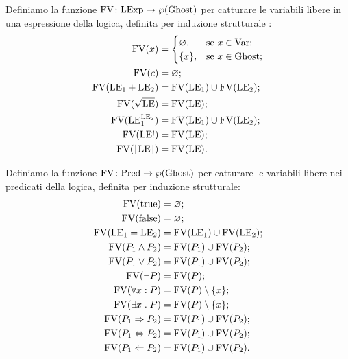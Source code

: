 \begin{definizione} 
Definiamo la funzione $\mathord{\mathrm{FV}}\colon\mathrm{LExp}\to\wp(\mathrm{Ghost})$ per catturare le variabili libere in una espressione della logica, definita per induzione strutturale :
\begin{align*}
   \mathrm{FV}(x)
      &=
        \begin{cases}
            \varnothing,&\text{se $x  \in \mathrm{Var}$};\\
            \{x\},    &\text{se $x  \in \mathrm{Ghost}$};
        \end{cases} \\
   \mathrm{FV}(c)
      &= \varnothing;\\
   \mathrm{FV}(\mathrm{LE}_1 + \mathrm{LE}_2)
      &= \mathrm{FV}(\mathrm{LE}_1) \cup \mathrm{FV}(\mathrm{LE}_2);\\
   \mathrm{FV}(\sqrt{\mathrm{LE}})
      &= \mathrm{FV}(\mathrm{LE});\\
   \mathrm{FV}(\mathrm{LE}_1^{\mathrm{LE}_2})
      &= \mathrm{FV}(\mathrm{LE}_1) \cup \mathrm{FV}(\mathrm{LE}_2);\\
   \mathrm{FV}(\mathrm{LE}!)
      &= \mathrm{FV}(\mathrm{LE});\\
   \mathrm{FV}(\lfloor \mathrm{LE} \rfloor)
      &= \mathrm{FV}(\mathrm{LE}).
\end{align*}
\end{definizione}

\begin{definizione} 
Definiamo la funzione $\mathord{\mathrm{FV}}\colon\mathrm{Pred}\to\wp(\mathrm{Ghost})$ per catturare
le variabili libere nei predicati della logica,
definita per induzione strutturale:
\begin{align*}
   \mathrm{FV}(\mathrm{true})
      &= \varnothing;\\
   \mathrm{FV}(\mathrm{false})
      &= \varnothing;\\
   \mathrm{FV}(\mathrm{LE}_1 = \mathrm{LE}_2)
      &= \mathrm{FV}(\mathrm{LE}_1) \cup \mathrm{FV}(\mathrm{LE}_2);\\
   \mathrm{FV}(P_1 \land P_2)
      &= \mathrm{FV}(P_1) \cup \mathrm{FV}(P_2);\\
   \mathrm{FV}(P_1 \lor P_2)
      &= \mathrm{FV}(P_1) \cup \mathrm{FV}(P_2);\\
   \mathrm{FV}(\neg P)
      &= \mathrm{FV}(P);\\
   \mathrm{FV}(\forall x \mathrel{:} P)
      &= \mathrm{FV}(P)\setminus \{x\};\\
   \mathrm{FV}(\exists x \mathrel{.} P)
      &= \mathrm{FV}(P)\setminus \{x\};\\
   \mathrm{FV}(P_1 \Rightarrow P_2)
      &= \mathrm{FV}(P_1) \cup \mathrm{FV}(P_2);\\
   \mathrm{FV}(P_1 \Leftrightarrow P_2)
      &= \mathrm{FV}(P_1) \cup \mathrm{FV}(P_2);\\
   \mathrm{FV}(P_1 \Leftarrow P_2)
      &= \mathrm{FV}(P_1) \cup \mathrm{FV}(P_2).
\end{align*}
\end{definizione}

